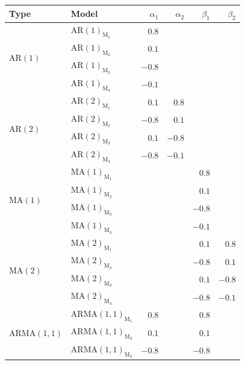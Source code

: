 \documentclass[11pt,a4paper]{article}
\begin{document}
\begin{table}[hbt]
	\centering
	\begin{tabular}{llrrrr}
		\toprule
		\textbf{Type} & \textbf{Model} & $\alpha_1$ & $\alpha_2$ & $\beta_1$ & $\beta_2$ \\
		\midrule
		\multirow{4}[2]{*}{$\mathrm{AR}(1)$}      & $\mathrm{AR}(1)_{\textrm{M}_1}$  & $0.8$   &      &      &      \\
		& $\mathrm{AR}(1)_{\textrm{M}_2}$   & $0.1$   &      &      &      \\
		& $\mathrm{AR}(1)_{\textrm{M}_3}$   & $-0.8$  &      &      &      \\
		& $\mathrm{AR}(1)_{\textrm{M}_4}$   & $-0.1$  &      &      &      \\
		\midrule
		\multirow{4}[2]{*}{$\mathrm{AR}(2)$}      & $\mathrm{AR}(2)_{\textrm{M}_1}$   & $0.1$   & $0.8$  &      &      \\
		& $\mathrm{AR}(2)_{\textrm{M}_2}$  & $-0.8$  & $0.1$  &      &      \\
		& $\mathrm{AR}(2)_{\textrm{M}_3}$  & $0.1$   & $-0.8$ &      &      \\
		& $\mathrm{AR}(2)_{\textrm{M}_4}$  & $-0.8$  & $-0.1$ &      &      \\
		\midrule
		\multirow{4}[2]{*}{	$\mathrm{MA}(1)$}      & $\mathrm{MA}(1)_{\textrm{M}_1}$ &       &      & $0.8$  &      \\
		& $\mathrm{MA}(1)_{\textrm{M}_2}$  &       &      & $0.1$  &      \\
		& $\mathrm{MA}(1)_{\textrm{M}_3}$  &       &      & $-0.8$ &      \\
		& $\mathrm{MA}(1)_{\textrm{M}_4}$  &       &      & $-0.1$ &      \\
		\midrule
		\multirow{4}[2]{*}{$\mathrm{MA}(2)$}      & $\mathrm{MA}(2)_{\textrm{M}_1}$  &       &      & $0.1$  & $0.8$  \\
		& $\mathrm{MA}(2)_{\textrm{M}_2}$  &       &      & $-0.8$ & $0.1$  \\
		& $\mathrm{MA}(2)_{\textrm{M}_3}$  &       &      & $0.1$  & $-0.8$ \\
		& $\mathrm{MA}(2)_{\textrm{M}_4}$  &       &      & $-0.8$ & $-0.1$ \\
		\midrule
		\multirow{4}[2]{*}{$\mathrm{ARMA}(1,1)$}  & $\mathrm{ARMA}(1,1)_{\textrm{M}_1}$ & $0.8$ &      & $0.8$  &      \\
		& $\mathrm{ARMA}(1,1)_{\textrm{M}_2}$ & $0.1$ &      & $0.1$  &      \\
		& $\mathrm{ARMA}(1,1)_{\textrm{M}_3}$ & $-0.8$ &     & $-0.8$ &      \\

\end{tabular}
\end{table}
\end{document}
